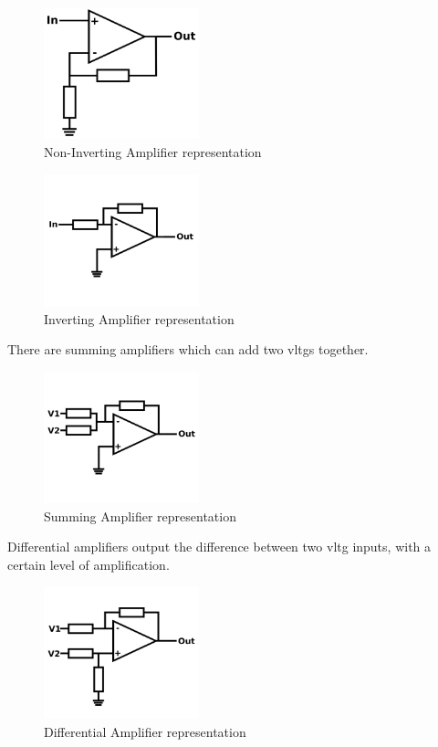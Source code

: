\documentclass[a4paper,11pt]{report}
\begin{document}
\begin{figure}[H]
\centering
\includegraphics[width=0.4\textwidth]{noninvertingamp}
\caption{Non-Inverting Amplifier representation}
\end{figure}

\begin{figure}[H]
\centering
\includegraphics[width=0.4\textwidth]{invertingamp}
\caption{Inverting Amplifier representation}
\end{figure}

There are summing amplifiers which can add two \gls{vltg}s together.

\begin{figure}[H]
\centering
\includegraphics[width=0.4\textwidth]{summingamp}
\caption{Summing Amplifier representation}
\end{figure}

Differential amplifiers output the difference between two \gls{vltg} inputs, with a certain level of amplification.

\begin{figure}[H]
\centering
\includegraphics[width=0.4\textwidth]{differentialamp}
\caption{Differential Amplifier representation}
\end{figure}
\end{document}
